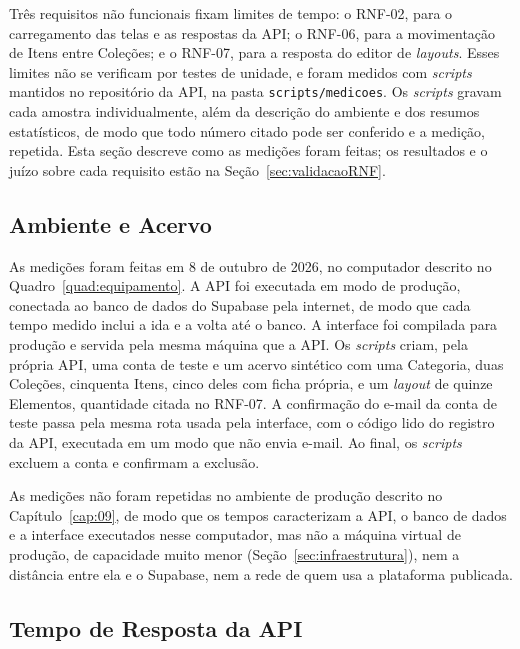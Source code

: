 Três requisitos não funcionais fixam limites de tempo: o RNF-02, para o carregamento das telas e as respostas da API; o RNF-06, para a movimentação de Itens entre Coleções; e o RNF-07, para a resposta do editor de \textit{layouts}. Esses limites não se verificam por testes de unidade, e foram medidos com \textit{scripts} mantidos no repositório da API, na pasta \texttt{scripts/medicoes}. Os \textit{scripts} gravam cada amostra individualmente, além da descrição do ambiente e dos resumos estatísticos, de modo que todo número citado pode ser conferido e a medição, repetida. Esta seção descreve como as medições foram feitas; os resultados e o juízo sobre cada requisito estão na Seção~\ref{sec:validacaoRNF}.

\subsection{Ambiente e Acervo}

As medições foram feitas em 8 de outubro de 2026, no computador descrito no Quadro~\ref{quad:equipamento}. A API foi executada em modo de produção, conectada ao banco de dados do Supabase pela internet, de modo que cada tempo medido inclui a ida e a volta até o banco. A interface foi compilada para produção e servida pela mesma máquina que a API. Os \textit{scripts} criam, pela própria API, uma conta de teste e um acervo sintético com uma Categoria, duas Coleções, cinquenta Itens, cinco deles com ficha própria, e um \textit{layout} de quinze Elementos, quantidade citada no RNF-07. A confirmação do e-mail da conta de teste passa pela mesma rota usada pela interface, com o código lido do registro da API, executada em um modo que não envia e-mail. Ao final, os \textit{scripts} excluem a conta e confirmam a exclusão.

As medições não foram repetidas no ambiente de produção descrito no Capítulo~\ref{cap:09}, de modo que os tempos caracterizam a API, o banco de dados e a interface executados nesse computador, mas não a máquina virtual de produção, de capacidade muito menor (Seção~\ref{sec:infraestrutura}), nem a distância entre ela e o Supabase, nem a rede de quem usa a plataforma publicada.

\subsection{Tempo de Resposta da API}

